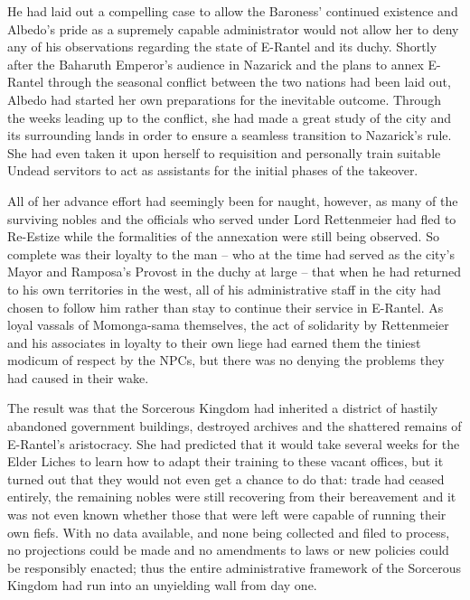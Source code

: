  

He had laid out a compelling case to allow the Baroness’ continued existence and Albedo’s pride as a supremely capable administrator would not allow her to deny any of his observations regarding the state of E-Rantel and its duchy. Shortly after the Baharuth Emperor’s audience in Nazarick and the plans to annex E-Rantel through the seasonal conflict between the two nations had been laid out, Albedo had started her own preparations for the inevitable outcome. Through the weeks leading up to the conflict, she had made a great study of the city and its surrounding lands in order to ensure a seamless transition to Nazarick’s rule. She had even taken it upon herself to requisition and personally train suitable Undead servitors to act as assistants for the initial phases of the takeover.

 

All of her advance effort had seemingly been for naught, however, as many of the surviving nobles and the officials who served under Lord Rettenmeier had fled to Re-Estize while the formalities of the annexation were still being observed. So complete was their loyalty to the man – who at the time had served as the city’s Mayor and Ramposa’s Provost in the duchy at large – that when he had returned to his own territories in the west, all of his administrative staff in the city had chosen to follow him rather than stay to continue their service in E-Rantel. As loyal vassals of Momonga-sama themselves, the act of solidarity by Rettenmeier and his associates in loyalty to their own liege had earned them the tiniest modicum of respect by the NPCs, but there was no denying the problems they had caused in their wake.

 

The result was that the Sorcerous Kingdom had inherited a district of hastily abandoned government buildings, destroyed archives and the shattered remains of E-Rantel’s aristocracy. She had predicted that it would take several weeks for the Elder Liches to learn how to adapt their training to these vacant offices, but it turned out that they would not even get a chance to do that: trade had ceased entirely, the remaining nobles were still recovering from their bereavement and it was not even known whether those that were left were capable of running their own fiefs. With no data available, and none being collected and filed to process, no projections could be made and no amendments to laws or new policies could be responsibly enacted; thus the entire administrative framework of the Sorcerous Kingdom had run into an unyielding wall from day one.

